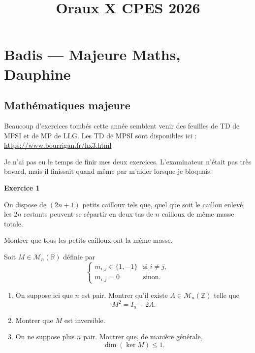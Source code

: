 \documentclass[11pt,a4paper]{article}
\title{Oraux X CPES 2026}
\begin{document}
\maketitle

\tableofcontents
\newpage

\section{Badis --- Majeure Maths, Dauphine}

\subsection{Mathématiques majeure}

Beaucoup d'exercices tombés cette année semblent venir des feuilles de TD de MPSI et de MP de LLG. Les TD de MPSI sont disponibles ici : \url{https://www.bourrigan.fr/hx3.html}

Je n'ai pas eu le temps de finir mes deux exercices. L'examinateur n'était pas très bavard, mais il finissait quand même par m'aider lorsque je bloquais.

\bigskip

\textbf{Exercice 1}

On dispose de $(2n+1)$ petits cailloux tels que, quel que soit le caillou enlevé, les $2n$ restants peuvent se répartir en deux tas de $n$ cailloux de même masse totale.

Montrer que tous les petits cailloux ont la même masse.

\vspace{0.3cm}

Soit $M \in \mathcal{M}_n(\mathbb{R})$ définie par
\[
\begin{cases}
 m_{i,j}\in\{1,-1\} & \text{si } i\neq j, \\
 m_{i,j}=0 & \text{sinon.}
\end{cases}
\]

\begin{enumerate}
    \item On suppose ici que $n$ est pair. Montrer qu'il existe $A \in \mathcal{M}_n(\mathbb{Z})$ telle que
    \[
    M^2 = I_n + 2A.
    \]

    \item Montrer que $M$ est inversible.

    \item On ne suppose plus $n$ pair. Montrer que, de manière générale,
    \[
    \dim(\ker M) \leq 1.
    \]
\end{enumerate}
\end{document}
